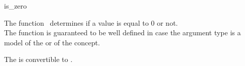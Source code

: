 \begin{ccRefFunction}{is_zero}

\ccDefinition

The function \ccRefName\ determines if a value is equal to 0 or not.\\
The function is guaranteed to be well defined in case the argument type 
is a model of the  or of 
the  concept. 


        { The  is convertible to . }

\ccSeeAlso

\\
\\
\\
\\

\end{ccRefFunction}
